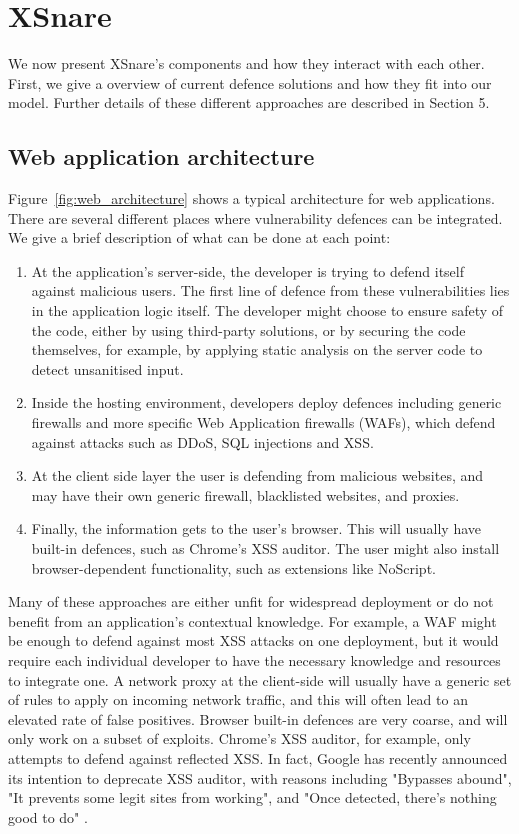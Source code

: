 \section{XSnare}

We now present XSnare's components and how they interact with each other. First, we give a overview of current defence solutions and how they fit into our model. Further details of these different approaches are described in Section 5.

\subsection{Web application architecture}
Figure~\ref{fig:web_architecture} shows a typical architecture for web applications. There are several different places where vulnerability defences can be integrated. We give a brief description of what can be done at each point:
\begin{enumerate}
	\item  At the application's server-side, the developer is trying to defend itself against malicious users. The first line of defence from these vulnerabilities lies in the application logic itself. The developer might choose to ensure safety of the code, either by using third-party solutions, or by securing the code themselves, for example, by applying static analysis on the server code to detect unsanitised input.
	\item Inside the hosting environment, developers deploy defences including generic firewalls and more specific Web Application firewalls (WAFs), which defend against  attacks such as DDoS, SQL injections and XSS.
	\item At the client side layer the user is defending from malicious websites, and may have their own generic firewall, blacklisted websites, and proxies. 
	\item Finally, the information gets to the user's browser. This will usually have built-in defences, such as Chrome's XSS auditor. The user might also install browser-dependent functionality, such as extensions like NoScript.
\end{enumerate}

Many of these approaches are either unfit for widespread deployment or do not benefit from an application's contextual knowledge. For example, a WAF might be enough to defend against most XSS attacks on one deployment, but it would require each individual developer to have the necessary knowledge and resources to integrate one. A network proxy at the client-side will usually have a generic set of rules to apply on incoming network traffic, and this will often lead to an elevated rate of false positives. Browser built-in defences are very coarse, and will only work on a subset of exploits. Chrome's XSS auditor, for example, only attempts to defend against reflected XSS. In fact, Google has recently announced its intention to deprecate XSS auditor, with reasons including "Bypasses abound", "It prevents some legit sites from working", and "Once detected, there’s nothing good to do" \cite{deprecatexssauditor}.

